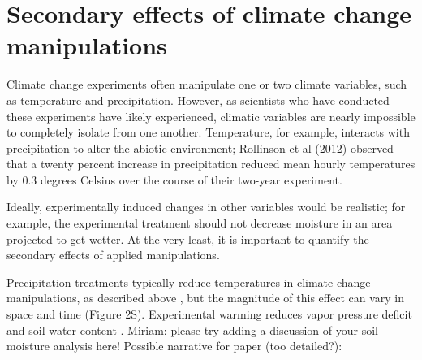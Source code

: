 \documentclass{article}
\begin{document}
\section* {Secondary effects of climate change manipulations}
Climate change experiments often manipulate one or two climate variables, such as temperature and precipitation. However, as scientists who have conducted these experiments have likely experienced, climatic variables are nearly impossible to completely isolate from one another. %
Temperature, for example, interacts with precipitation to alter the abiotic environment; Rollinson et al (2012) observed that a twenty percent increase in precipitation reduced mean hourly temperatures by 0.3 degrees Celsius over the course of their two-year experiment. 

Ideally, experimentally induced changes in other variables would be realistic; for example, the experimental treatment should not decrease moisture in an area projected to get wetter.%
At the very least, it is important to quantify the secondary effects of applied manipulations.  

\par Precipitation treatments typically reduce temperatures in climate change manipulations, as described above \citep{sherry2007,rollinson2012}, but the magnitude of this effect can vary in space and time (Figure 2S). Experimental warming  reduces vapor pressure deficit and soil water content \citep[e.g. Figure 3S][]{sherry2007,morin2010,templer2016}. Miriam: please try adding a discussion of your soil moisture analysis here!
Possible narrative for paper (too detailed?):
\end{document}
